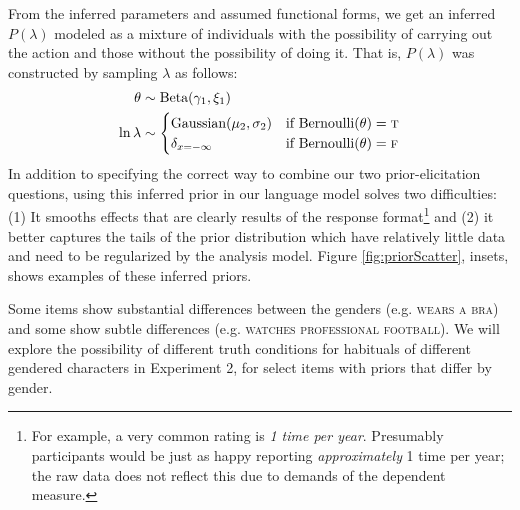 \documentclass[10pt,letterpaper]{article}
\newcommand{\ndg}[1]{\textcolor{Green}{[ndg: #1]}}
\begin{document}
From the inferred parameters and assumed functional forms, we get an inferred $P(\lambda)$ modeled as a mixture of individuals with the possibility of carrying out the action and those without the possibility of doing it. 
That is, $P(\lambda)$ was constructed by sampling $\lambda$ as follows:
\begin{align}
\theta & \sim \text{Beta}(\gamma_{1}, \xi_{1}) \nonumber \\ 
\ln \lambda & \sim \begin{cases}
		\text{Gaussian}(\mu_{2}, \sigma_{2}) &\mbox{if } \text{Bernoulli}(\theta) = \textsc{t} \label{eq:priorModel}  \\
				\delta_{x=-\infty} &\mbox{if } \text{Bernoulli}(\theta) = \textsc{f} \\
		\end{cases}
\end{align}
In addition to specifying the correct way to combine our two prior-elicitation questions, using this inferred prior in our language model solves two difficulties: (1) It smooths effects that are clearly results of the response format\footnote{For example, a very common rating is \emph{1 time per year}. Presumably participants would be just as happy reporting \emph{approximately} 1 time per year; the raw data does not reflect this due to demands of the dependent measure.} 
and (2) it better captures the tails of the prior distribution which have relatively little data and need to be regularized by the analysis model.
Figure \ref{fig:priorScatter}, insets, shows examples of these inferred priors.

Some items show substantial differences between the genders (e.g. \textsc{wears a bra}) and some show subtle differences (e.g. \textsc{watches professional football}). 
We will explore the possibility of different truth conditions for habituals of different gendered characters in Experiment 2, for select items with priors that differ by gender.
\end{document}

